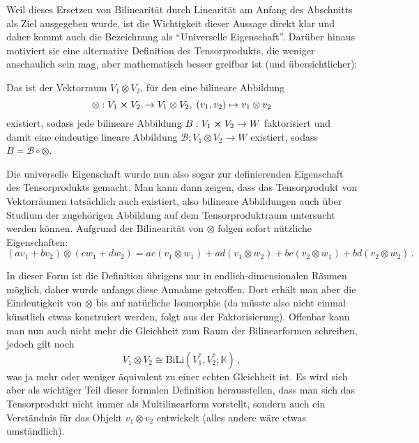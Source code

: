 \documentclass[../H_Analysis_main.tex]{subfiles}
\begin{document}
Weil dieses Ersetzen von Bilinearität durch Linearität am Anfang des Abschnitts als Ziel ausgegeben wurde, ist die Wichtigkeit dieser Aussage direkt klar und daher kommt auch die Bezeichnung als \enquote{Universelle Eigenschaft}. Darüber hinaus motiviert sie eine alternative Definition des Tensorprodukts, die weniger anschaulich sein mag, aber mathematisch besser greifbar ist (und übersichtlicher):
\begin{defi}%
Das  ist der Vektorraum $V_1 \otimes V_2$, für den eine bilineare Abbildung
\begin{equation}
\otimes: V_1 \cross V_2, \rightarrow V_1 \otimes V_2, \; (v_1, v_2) \mapsto v_1 \otimes v_2
\end{equation}
existiert, sodass jede bilineare Abbildung $B: V_1 \cross V_2 \rightarrow W$ faktorisiert und damit eine eindeutige lineare Abbildung $\mathcal{B}: V_1 \otimes V_2 \rightarrow W$ existiert, sodass $B = \mathcal{B} \circ \otimes$.
\end{defi}

Die universelle Eigenschaft wurde nun also sogar zur definierenden Eigenschaft des Tensorprodukts gemacht. Man kann dann zeigen, dass das Tensorprodukt von Vektorräumen tatsächlich auch existiert, also bilineare Abbildungen auch über Studium der zugehörigen Abbildung auf dem Tensorproduktraum untersucht werden können. Aufgrund der Bilinearität von $\otimes$ folgen sofort nützliche Eigenschaften:
\begin{equation}\label{eq:eigschtensprod}
(a v_1 + b v_2) \otimes (c w_1 + d w_2) = ac (v_1 \otimes w_1) + ad (v_1 \otimes w_2) + bc (v_2 \otimes w_1) + bd (v_2 \otimes w_2) \, .
\end{equation}

In dieser Form ist die Definition übrigens nur in endlich-dimensionalen Räumen möglich, daher wurde anfangs diese  Annahme getroffen. Dort erhält man aber die Eindeutigkeit von $\otimes$ bis auf natürliche Isomorphie (da müsste also nicht einmal künstlich etwas konstruiert werden, folgt aus der Faktorisierung). Offenbar kann man nun auch nicht mehr die Gleichheit zum Raum der Bilinearformen schreiben, jedoch gilt noch
\begin{equation}
V_1 \otimes V_2 \cong \text{BiLi}(V_1^*, V_2^*; \mathbb{K}) \, ,
\end{equation}
was ja mehr oder weniger äquivalent zu einer echten Gleichheit ist. Es wird sich aber als wichtiger Teil dieser formalen Definition herausstellen, dass man sich das Tensorprodukt nicht immer als Multilinearform vorstellt, sondern auch ein Verständnis für das Objekt $v_1 \otimes v_2$ entwickelt (alles andere wäre etwas umständlich).
\end{document}
